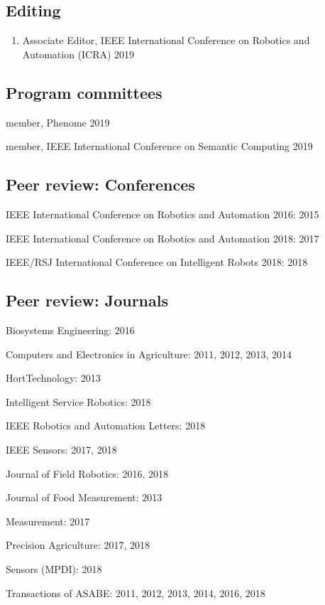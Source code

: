 \documentclass[letterpaper,11pt]{article}
\begin{document}
\subsection{Editing}
\begin{enumerate}[noitemsep, leftmargin=*,label={}]
\item{Associate Editor, IEEE International Conference on Robotics and Automation (ICRA) 2019}
\end{enumerate}

\subsection{Program committees}
\begin{enumerate}[noitemsep, leftmargin=*,label={[\arabic*]}]
\item{member, Phenome 2019}
\item{member, IEEE International Conference on Semantic Computing 2019}
\end{enumerate}

\subsection{Peer review: Conferences}
\begin{enumerate}[noitemsep, leftmargin=*,label={[\arabic*]}]
\item{IEEE International Conference on Robotics and Automation 2016: 2015}
\item{IEEE International Conference on Robotics and Automation 2018: 2017}
\item{IEEE/RSJ International Conference on Intelligent Robots 2018: 2018}
\end{enumerate}

\subsection{Peer review: Journals}
\begin{enumerate}[noitemsep, leftmargin=*,label={[\arabic*]}]
\item{Biosystems Engineering: 2016}
\item{Computers and Electronics in Agriculture: 2011, 2012, 2013, 2014}
\item{HortTechnology: 2013}
\item{Intelligent Service Robotics: 2018}
\item{IEEE Robotics and Automation Letters: 2018}
\item{IEEE Sensors: 2017, 2018}
\item{Journal of Field Robotics: 2016, 2018}
\item{Journal of Food Measurement: 2013}
\item{Measurement: 2017}
\item{Precision Agriculture: 2017, 2018}
\item{Sensors (MPDI): 2018}
\item{Transactions of ASABE: 2011, 2012, 2013, 2014, 2016, 2018}
\end{enumerate}
\end{document}
